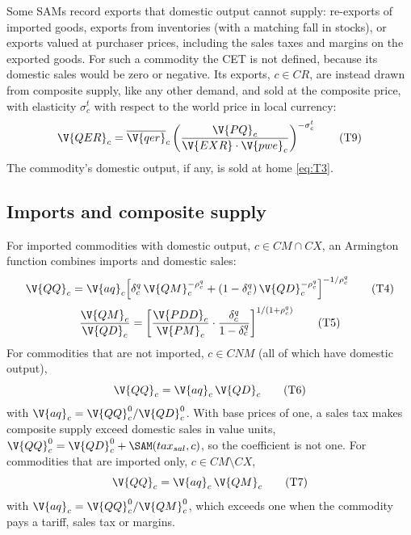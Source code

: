 Some SAMs record exports that domestic output cannot supply: re-exports of
imported goods, exports from inventories (with a matching fall in stocks), or
exports valued at purchaser prices, including the sales taxes and margins on
the exported goods. For such a commodity the CET is not defined, because its
domestic sales would be zero or negative. Its exports, $c \in CR$, are instead
drawn from composite supply, like any other demand, and sold at the composite
price, with elasticity $\sigma^t_c$ with respect to the world price in local
currency:
\begin{equation}
\V{QER}_c = \overline{\V{qer}}_c\left(\frac{\V{PQ}_c}{\V{EXR}\cdot\V{pwe}_c}\right)^{-\sigma^t_c}
\tag{T9}\label{eq:T9}
\end{equation}
The commodity's domestic output, if any, is sold at home \eqref{eq:T3}.

\subsection{Imports and composite supply}

For imported commodities with domestic output, $c \in CM \cap CX$, an
Armington function combines imports and domestic sales:
\begin{equation}
\V{QQ}_c = \V{aq}_c\Bigl[\delta^q_c\,\V{QM}_c^{-\rho^q_c} + (1 - \delta^q_c)\,\V{QD}_c^{-\rho^q_c}\Bigr]^{-1/\rho^q_c}
\tag{T4}\label{eq:T4}
\end{equation}
\begin{equation}
\frac{\V{QM}_c}{\V{QD}_c} = \left[\frac{\V{PDD}_c}{\V{PM}_c}\cdot\frac{\delta^q_c}{1 - \delta^q_c}\right]^{1/(1 + \rho^q_c)}
\tag{T5}\label{eq:T5}
\end{equation}
For commodities that are not imported, $c \in CNM$ (all of which have
domestic output),
\begin{equation}
\V{QQ}_c = \V{aq}_c\,\V{QD}_c
\tag{T6}\label{eq:T6}
\end{equation}
with $\V{aq}_c = \V{QQ}^0_c / \V{QD}^0_c$. With base prices of one, a sales tax
makes composite supply exceed domestic sales in value units,
$\V{QQ}^0_c = \V{QD}^0_c + \SAM(tax_{sal}, c)$, so the coefficient is not one.
For commodities that are imported only, $c \in CM \setminus CX$,
\begin{equation}
\V{QQ}_c = \V{aq}_c\,\V{QM}_c
\tag{T7}\label{eq:T7}
\end{equation}
with $\V{aq}_c = \V{QQ}^0_c / \V{QM}^0_c$, which exceeds one when the commodity
pays a tariff, sales tax or margins.

